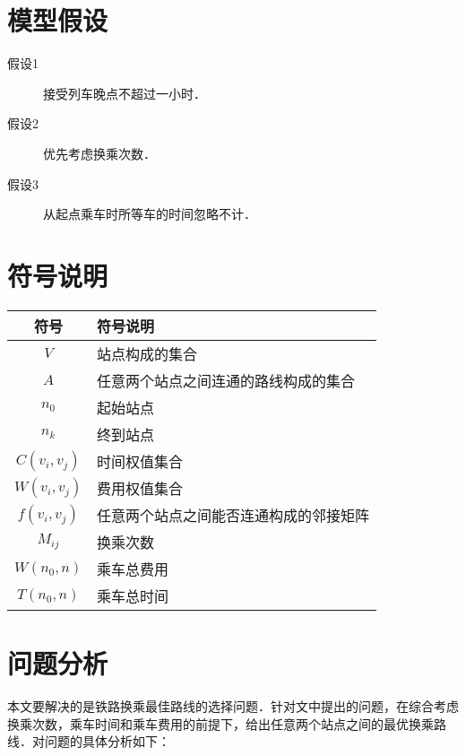 \documentclass[nocover]{cumcmart}%
\begin{document}
\section{模型假设}
\begin{description}
  \item[假设1] 接受列车晚点不超过一小时．
  \item[假设2] 优先考虑换乘次数．
  \item[假设3] 从起点乘车时所等车的时间忽略不计．
\end{description}

\section{符号说明}
\begin{table}[H]
  \centering
  \begin{tabular}{cl}
     \toprule
     符号 & 符号说明 \\
     \midrule
     $V$ & 站点构成的集合 \\
     $A$ & 任意两个站点之间连通的路线构成的集合 \\
     $n_0$ & 起始站点 \\
     $n_k$ & 终到站点 \\
     $C(v_i,v_j)$ & 时间权值集合 \\
     $W(v_i,v_j)$ & 费用权值集合 \\
     $f(v_i,v_j)$ & 任意两个站点之间能否连通构成的邻接矩阵 \\
     $M_{ij}$ & 换乘次数 \\
     $W(n_0,n)$ & 乘车总费用 \\
     $T(n_0,n)$ & 乘车总时间 \\
     \bottomrule
   \end{tabular}
\end{table}

\section{问题分析}
本文要解决的是铁路换乘最佳路线的选择问题．针对文中提出的问题，在综合考虑换乘次数，乘车时间和乘车费用的前提下，给出任意两个站点之间的最优换乘路线．对问题的具体分析如下：
\end{document}
